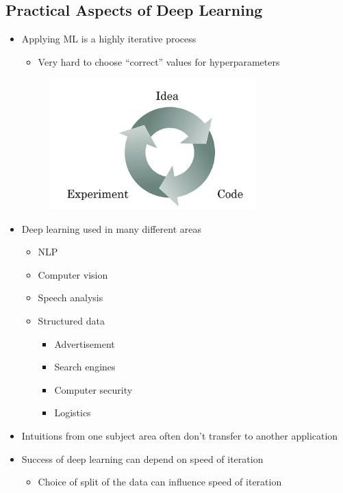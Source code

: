\documentclass[12pt, letterpaper]{article}
\begin{document}
    \subsection{Practical Aspects of Deep Learning}
    \begin{itemize}
        \item Applying ML is a highly iterative process
        \begin{itemize}
            \item Very hard to choose ``correct'' values for hyperparameters
        \end{itemize}
        \begin{figure}[ht]
            \centering
            \includegraphics[width=8cm]{13.png}
        \end{figure}
        \item Deep learning used in many different areas
        \begin{itemize}
            \item NLP
            \item Computer vision 
            \item Speech analysis
            \item Structured data
            \begin{itemize}
                \item Advertisement
                \item Search engines
                \item Computer security
                \item Logistics 
            \end{itemize}
        \end{itemize}
        \item Intuitions from one subject area often don't transfer to another application
        \item Success of deep learning can depend on speed of iteration
        \begin{itemize}
            \item Choice of split of the data can influence speed of iteration

\end{itemize}
\end{itemize}
\end{document}
